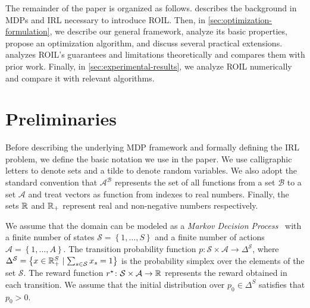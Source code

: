 \documentclass[10pt]{article}
\renewcommand{\cite}{\citep}
\theoremstyle{plain}
\theoremstyle{remark}
\begin{document}
The remainder of the paper is organized as follows.  describes the background in MDPs and IRL necessary to introduce ROIL. Then, in \cref{sec:optimization-formulation}, we describe our general framework, analyze its basic properties, propose an optimization algorithm, and discuss several practical extensions.  analyzes ROIL's guarantees and limitations theoretically and compares them with prior work. Finally, in \cref{sec:experimental-results}, we analyze ROIL numerically and compare it with relevant algorithms. 

\section{Preliminaries}\label{sec:preliminaries}

Before describing the underlying MDP framework and formally defining the IRL problem, we define the basic notation we use in the paper. We use calligraphic letters to denote sets and a tilde to denote random variables. We also adopt the standard convention that $\mathcal{A}^{\mathcal{B}}$ represents the set of all functions from a set $\mathcal{B}$ to a set $\mathcal{A}$ and treat vectors as function from indexes to real numbers. Finally, the sets $\mathbb{R}$ and $\mathbb{R}_+$ represent real and non-negative numbers respectively. 




We assume that the domain can be modeled as a \emph{Markov Decision Process}~\cite{Puterman1994} with a finite number of states $\mathcal{S} = \left\{ 1, \dots , S \right\}$ and a finite number of actions $\mathcal{A} = \left\{ 1, \dots , A \right\}$. The transition probability function $p\colon \mathcal{S} \times \mathcal{A} \to \Delta^{\mathcal{S}}$, where $\Delta^{\mathcal{S}} = \left\{ x\in \mathbb{R}_{+}^S \mid \sum_{s\in \mathcal{S}} x_s =1 \right\}$ is the probability simplex over the elements of the set $\mathcal{S}$. The reward function $r^{\mathnormal{\star}} \colon \mathcal{S} \times \mathcal{A} \to \mathbb{R}$ represents the reward obtained in each transition. We assume that the initial distribution over $p_0\in \Delta^S$ satisfies that $p_0 > 0$.
\end{document}
